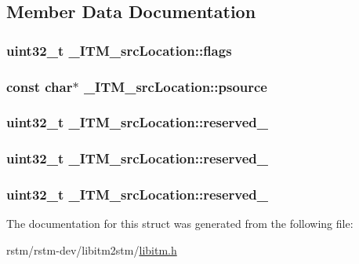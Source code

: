 \subsection{Member Data Documentation}
\hypertarget{struct__ITM__srcLocation_abf637c1bb5af730098418fd75fe0f468}{
\subsubsection[{flags}]{\setlength{\rightskip}{0pt plus 5cm}uint32\-\_\-t \-\_\-\-I\-T\-M\-\_\-src\-Location\-::flags}}\label{struct__ITM__srcLocation_abf637c1bb5af730098418fd75fe0f468}
\hypertarget{struct__ITM__srcLocation_a69a483233c726bd374a7ddcc7a9af63b}{
\subsubsection[{psource}]{\setlength{\rightskip}{0pt plus 5cm}const char$\ast$ \-\_\-\-I\-T\-M\-\_\-src\-Location\-::psource}}\label{struct__ITM__srcLocation_a69a483233c726bd374a7ddcc7a9af63b}
\hypertarget{struct__ITM__srcLocation_a184c870ced2e99dff061ac1cc073f5f6}{
\subsubsection[{reserved\-\_\-1}]{\setlength{\rightskip}{0pt plus 5cm}uint32\-\_\-t \-\_\-\-I\-T\-M\-\_\-src\-Location\-::reserved\-\_}}\label{struct__ITM__srcLocation_a184c870ced2e99dff061ac1cc073f5f6}
\hypertarget{struct__ITM__srcLocation_acf614ee1ed220ca3afc3571e6beeca5b}{
\subsubsection[{reserved\-\_\-2}]{\setlength{\rightskip}{0pt plus 5cm}uint32\-\_\-t \-\_\-\-I\-T\-M\-\_\-src\-Location\-::reserved\-\_}}\label{struct__ITM__srcLocation_acf614ee1ed220ca3afc3571e6beeca5b}
\hypertarget{struct__ITM__srcLocation_aeb43959f35bea1370b03ab058f19a18e}{
\subsubsection[{reserved\-\_\-3}]{\setlength{\rightskip}{0pt plus 5cm}uint32\-\_\-t \-\_\-\-I\-T\-M\-\_\-src\-Location\-::reserved\-\_}}\label{struct__ITM__srcLocation_aeb43959f35bea1370b03ab058f19a18e}


The documentation for this struct was generated from the following file\-:\begin{DoxyCompactItemize}
\item 
rstm/rstm-\/dev/libitm2stm/\hyperlink{libitm_8h}{libitm.\-h}\end{DoxyCompactItemize}
